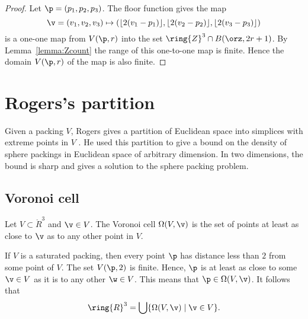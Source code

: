\begin{proof}  Let $\p = (p_1,p_2,p_3)$. The floor function gives the map
\begin{displaymath}\v=(v_1,v_2,v_3)\mapsto (\lfloor 2(v_1-p_1)
\rfloor, \lfloor 2(v_2-p_2) \rfloor, \lfloor 2(v_3-p_3) \rfloor)\end{displaymath}
is a one-one map from $ V(\p,r)$ into the set $\ring{Z}^3\cap B(\orz,2r + 1)$.  By Lemma~\ref{lemma:Zcount} the range of this one-to-one map is finite. 
Hence the domain $ V(\p,r)$ of the map is also finite.
\end{proof}
%




\section{Rogers's partition}\label{sec:rogers}





Given a packing $ V$, Rogers gives a partition of Euclidean space into
simplices with extreme points in $ V$ \cite{Rogers:1958:Packing}.  He used
this partition to give a bound on the density of sphere packings in
Euclidean space of arbitrary dimension.  In two dimensions, the bound
is sharp and gives a solution to the sphere packing problem.


\subsection{Voronoi cell}

\begin{definition}\label{def:voronoi}
% 
Let $V\subset\ring{R}^3$ and $\v\in V$.
The Voronoi cell 
$\Omega(V,\v)$
is the set of points at least as close to $\v$ as to
any other point in $V$. 
\end{definition}

\begin{remark}
If $V$ is a saturated packing, then every point $\p$ has distance less than $2$ from
some point of $V$.  The set $V(\p,2)$ is finite.  Hence, $\p$ is at least as close to some
$\v\in V$ as it is to any other $\w\in V$.  This means that $\p\in\Omega(V,\v)$.
It follows that
\begin{equation}\label{eqn:vor-rn}
\ring{R}^3 = \bigcup \{\Omega(V,\v)\mid \v \in V\}.
\end{equation}
\end{remark}

